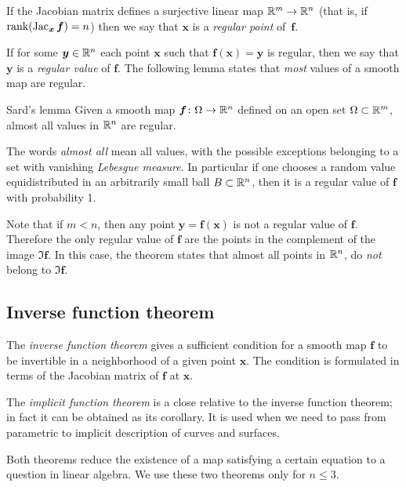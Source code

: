 If the Jacobian matrix defines a surjective linear map $\mathbb{R}^m\to\mathbb{R}^n$ (that is, if $\mathop{\rm rank}\nolimits(\mathop{\rm Jac}\nolimits_{\bm{x}}\bm{f})=n$) then we say that 
$\bm{x}$ is a \emph{regular point} of~$\bm{f}$.

If for some $\bm{y}\in \mathbb{R}^n$ each point $\bm{x}$ such that $\bm{f}(\bm{x})=\bm{y}$ is regular,
then we say that $\bm{y}$ is a \emph{regular value} of $\bm{f}$.
The following lemma states that {}\emph{most} values of a smooth map are regular.

\begin{thm}{Sard's lemma}\label{lem:sard}
Given a smooth map $\bm{f}\colon \Omega \z\to \RR^n$ defined on an open set $\Omega\subset \mathbb{R}^m$, almost all values in $\mathbb{R}^n$ are regular.
\end{thm}

The words \emph{almost all} mean all values, with the possible exceptions belonging to a set with vanishing {}\emph{Lebesgue measure}.
In particular if one chooses a random value equidistributed in an arbitrarily small ball $B\z\subset \RR^n$, then it is a regular value of $\bm{f}$ with probability 1.

Note that if $m<n$, then any point $\bm{y}=\bm{f}(\bm{x})$ is not a regular value of $\bm{f}$.
Therefore the only regular value of $\bm{f}$ are the points in the complement of the image $\Im \bm{f}$.
In this case, the theorem states that almost all points in $\mathbb{R}^n$, do {}\emph{not} belong to $\Im \bm{f}$.


\subsection*{Inverse function theorem}

The \emph{inverse function theorem} gives a sufficient condition for a smooth map $\bm{f}$ to be invertible in a neighborhood of a given point $\bm{x}$.
The condition is formulated in terms of the Jacobian matrix of $\bm{f}$ at $\bm{x}$.

The \emph{implicit function theorem} is a close relative to the inverse function theorem;
in fact it can be obtained as its corollary.
It is used when we need to pass from parametric to implicit description of curves and surfaces.

Both theorems reduce the existence of a map satisfying a certain equation to a question in linear algebra.
We use these two theorems only for $n\le 3$.

